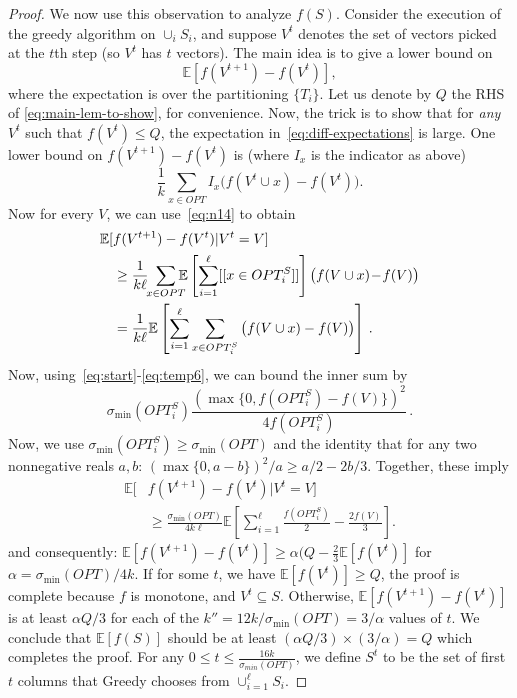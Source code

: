\documentclass{article}
\newcommand{\E}{\mathbb{E}}
\newcommand{\opt}{OPT}
\begin{document}
\begin{proof}
We now use this observation to analyze $f(S)$. Consider the execution of the greedy algorithm on $\cup_i S_i$, and suppose $V^t$ denotes the set of vectors picked at the $t$th step (so $V^t$ has $t$ vectors). The main idea is to give a lower bound on\begin{equation}
\label{eq:diff-expectations}
 \E[ f(V^{t+1}) - f(V^t) ],
\end{equation}
where the expectation is over the partitioning $\{T_i\}$. Let us denote by $Q$ the RHS of \eqref{eq:main-lem-to-show}, for convenience.  Now, the trick is to show that for {\em any} $V^t$ such that $f(V^t) \le Q$, the expectation in~\eqref{eq:diff-expectations} is large. One lower bound on $f(V^{t+1}) - f(V^t)$ is (where $I_x$ is the indicator as above) 
\[\frac{1}{k} \sum_{x\in \opt} I_x \big( f(V^t \cup x) - f(V^t) \big).\]
Now for every $V$, we can use~\eqref{eq:n14} to obtain
\begin{align}
\E[ &f(V^{t+1}) - f(V^t) | V^t = V] \notag \\
&\ge \frac{1}{k\ell} \!\! \sum_{x \in\opt} \!\!\!\! \E \left[ \sum_{i=1}^\ell [[x \in \opt_i^S]]\right] \big( f(V \cup x) \!-\! f(V) \big) \notag \\
&= \frac{1}{k\ell} \E \left[ \sum_{i=1}^\ell \sum_{x \in \opt_i^S} \big( f(V \cup x) - f(V) \big) \right] \,. \notag
\end{align} 
  Now, using~\eqref{eq:start}-\eqref{eq:temp6}, we can bound the inner sum by
\[ \sigma_{\min}(\opt_i^S) \frac{ ( \max\{ 0, f(\opt_i^S) - f(V)\} )^2}{4f(\opt_i^S)} \,.\]
Now, we use $\sigma_{\min}(\opt_i^S) \ge \sigma_{\min}(\opt)$ and the identity that for any two nonnegative reals $a, b$: $(\max\{ 0, a-b \})^2/a \ge a/2 - 2b/3$.
Together, these imply
\begin{align*}
\E[ & f(V^{t+1}) - f(V^t) | V^t = V ] \\
&\ge \frac{\sigma_{\min}(\opt)}{4k\ell} \E\left[ \sum_{i=1}^\ell \frac{f(\opt_i^S)}{2} - \frac{2 f(V)}{3} \right].
\end{align*}
and consequently: 
$\E[  f(V^{t+1}) - f(V^t)] 
\ge  \alpha (Q - \frac{2}{3}\E[f(V^t)]$ 
for $\alpha = \sigma_{\min}(\opt)/4k$. 
If for some $t$, we have $\E[f(V^t)] \geq Q$, the proof is complete because $f$ is monotone, and $V^t \subseteq S$. 
Otherwise,  $\E[f(V^{t+1}) - f(V^t)]$ is at least $\alpha Q/3$ for each of the $k'' = 12 k/\sigma_{\min}(OPT) = 3/\alpha$ values of $t$. We conclude that $\E[f(S)]$ should be at least $(\alpha Q/3) \times (3/\alpha) = Q$ which completes the proof. 
\iffalse
For any $0 \leq t \leq \frac{16k}{\sigma_{min}(OPT)}$, we define $S^t$ to be the set of first $t$ columns that Greedy chooses from $\cup_{i=1}^{\ell} S_i$.

\end{proof}
\end{document}

